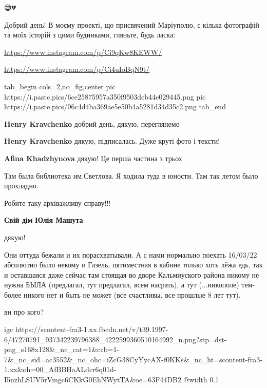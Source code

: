 
😪💔


Добрий день! В моєму проекті, що присвячений Маріуполю, є кілька фотографій та
моїх історій з цими будинками, гляньте, будь ласка:

\url{https://www.instagram.com/p/Ci9qKw8KEWW/}

\url{https://www.instagram.com/p/Ci4uIoBqN9t/}

\ifcmt
  tab_begin cols=2,no_fig,center
     pic https://i.paste.pics/6ce25875957a350f9503dcb44e029445.png
		 pic https://i.paste.pics/06c4d4ba369ae5e50b4a5281d34d35c2.png
  tab_end
\fi

\begin{itemize} %
\textbf{Henry Kravchenko} добрий день, дякую, переглянемо

\textbf{Henry Kravchenko} дякую, підписалась. Дуже круті фото і тексти!

\textbf{Afina Khadzhynova} дякую! Це перша частина з трьох
\end{itemize} %



Там была библиотека им.Светлова. Я ходила туда в юности. Там так летом было прохладно.


Робите таку архіважливу справу!!!

\textbf{Свій дім} \textbf{Юлія Машута}


дякую!


Они оттуда бежали и их порасхватывали. А с нами нормально поехать 16/03/22
абсолютно было некому и Газель, пятиместная в кабине только хоть лёжа едь, так
и оставшаяся даже сейчас там стоящая во дворе Кальмиуского района никому не
нужна БЫЛА (предлагал, тут предлагал, всем насрать), а тут (...никополе)
тем-более никого нет и быть не может (все счастливы, все прошлые 8 лет тут).


ви про кого?


\ifcmt
  igc https://scontent-fra3-1.xx.fbcdn.net/v/t39.1997-6/47270791_937342239796388_4222599360510164992_n.png?stp=dst-png_s168x128&_nc_cat=1&ccb=1-7&_nc_sid=ac3552&_nc_ohc=iZcG38CyYycAX-f0KKs&_nc_ht=scontent-fra3-1.xx&oh=00_AfBBHaALdcr6q01d-I5nzhLSUV5rVmgc6CKkG0EhNWytTA&oe=63F44DB2
	@width 0.1
\fi
